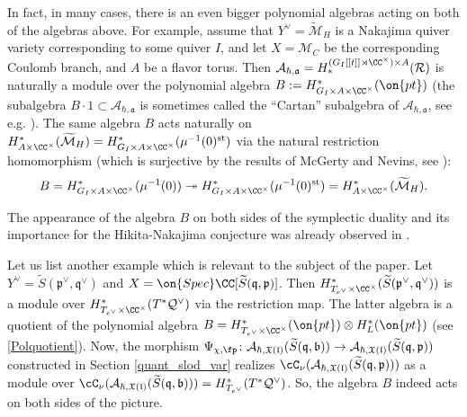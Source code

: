 \documentclass[12pt]{amsart}
\begin{document}
In fact, in many cases, there is an even bigger polynomial algebras acting on both of the algebras above. For example, assume that $Y^\vee=\widetilde{\mathcal{M}}_H$ is a Nakajima quiver variety corresponding to some quiver $I$, and let $X=\mathcal{M}_C$ be the corresponding Coulomb branch, and $A$ be a flavor torus. Then $\mathcal{A}_{\hbar,\mathfrak{a}}=H_*^{(G_I[[t]] \rtimes \CC^\times) \times A}(\mathcal{R})$ is naturally a module over the polynomial algebra $B:=H^*_{G_I \times A \times \CC^{\times}}(\on{pt})$ (the subalgebra $B \cdot 1\subset \mathcal{A}_{\hbar,\mathfrak{a}}$ is sometimes called the ``Cartan'' subalgebra of $\mathcal{A}_{\hbar,\mathfrak{a}}$, see e.g. \cite[Definition 3.16]{BFNII}). The same algebra $B$ acts naturally on $H^*_{A \times \CC^\times}(\widetilde{\mathcal{M}}_H)=H^*_{G_I \times A \times \CC^\times}(\mu^{-1}(0)^{\mathrm{st}})$ via the natural restriction homomorphism (which is surjective by the results of McGerty and Nevins, see \cite{kirwan_surj_quiv}):
\begin{equation*}
B=H^*_{G_I \times A\times \CC^\times}(\mu^{-1}(0)) \twoheadrightarrow H^*_{G_I \times A \times \CC^\times}(\mu^{-1}(0)^{\mathrm{st}})=H^*_{A \times \CC^{\times}}(\widetilde{\mathcal{M}}_H).
\end{equation*}


\begin{rmk}
The appearance of the algebra $B$ on both sides of the symplectic duality and its importance for the Hikita-Nakajima conjecture was already observed in \cite[Section 5.7]{HKW}.  
\end{rmk}



Let us list another example which is relevant to the subject of the paper. Let  $Y^\vee=\widetilde{S}(\mathfrak{p}^\vee,\mathfrak{q}^\vee)$ and $X=\on{Spec}\CC[\widetilde{S}(\mathfrak{q},\mathfrak{p})]$. Then $H^*_{T_{e^\vee} \times \CC^\times}(\widetilde{S}(\mathfrak{p}^\vee,\mathfrak{q}^\vee))$ is a module over $H^*_{T_{e^\vee} \times \CC^\times}(T^*\mathcal{Q}^\vee)$ via the restriction map. The latter algebra is a quotient of the polynomial algebra $B=H^*_{T_{e^\vee} \times \CC^\times}(\on{pt}) \otimes H^*_{L}(\on{pt})$ (see \cref{Polquotient}). Now, the morphism $\Psi_{\chi, \fp}\colon \mathcal{A}_{\hbar,\mathfrak{X}(\mathfrak{l})}(\widetilde{S}(\mathfrak{q},\mathfrak{b})) \rightarrow \mathcal{A}_{\hbar,\mathfrak{X}(\mathfrak{l})}(\widetilde{S}(\mathfrak{q},\mathfrak{p}))$  constructed in Section \ref{quant_slod_var}  realizes $\cC_\nu(\mathcal{A}_{\hbar,\mathfrak{X}(\mathfrak{l})}(\widetilde{S}(\mathfrak{q},\mathfrak{p})))$ as a module over $\cC_\nu(\mathcal{A}_{\hbar,\mathfrak{X}(\mathfrak{l})}(\widetilde{S}(\mathfrak{q},\mathfrak{b})))=H^*_{T_{e^\vee}}(T^*\mathcal{Q}^\vee)$. So, the algebra $B$ indeed acts on both sides of the picture. 
\end{document}

